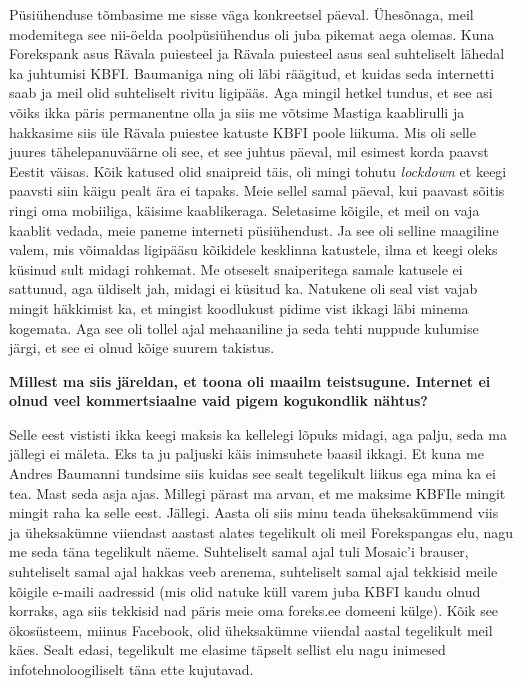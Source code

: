Püsiühenduse tõmbasime me sisse väga konkreetsel päeval. Ühesõnaga, meil modemitega see nii-öelda poolpüsiühendus oli juba pikemat aega olemas. Kuna Forekspank asus Rävala puiesteel ja Rävala puiesteel asus seal suhteliselt lähedal ka juhtumisi KBFI. Baumaniga ning oli läbi räägitud, et kuidas seda internetti saab ja meil olid  suhteliselt rivitu ligipääs. Aga mingil hetkel tundus, et see asi võiks ikka päris permanentne olla ja siis me võtsime Mastiga kaablirulli ja hakkasime siis üle Rävala puiestee katuste KBFI poole liikuma. Mis oli selle juures tähelepanuväärne oli see, et see juhtus päeval, mil esimest korda paavst Eestit väisas. Kõik katused olid snaipreid täis, oli mingi tohutu \emph{lockdown} et keegi paavsti siin käigu pealt ära ei tapaks. Meie sellel samal päeval, kui paavast sõitis ringi oma mobiiliga, käisime kaablikeraga. Seletasime kõigile, et meil on vaja kaablit vedada, meie paneme interneti püsiühendust. Ja see oli selline maagiline valem, mis  võimaldas ligipääsu kõikidele kesklinna katustele, ilma et keegi oleks küsinud sult midagi rohkemat. Me otseselt snaiperitega samale katusele ei sattunud, aga üldiselt jah, midagi ei küsitud ka. Natukene oli seal vist vajab mingit häkkimist ka, et mingist koodlukust pidime vist ikkagi läbi minema kogemata. Aga see oli tollel ajal mehaaniline ja seda tehti nuppude kulumise järgi, et see ei olnud kõige suurem takistus. 

\textbf{Millest ma siis järeldan, et toona oli maailm teistsugune. Internet ei olnud veel kommertsiaalne vaid pigem kogukondlik nähtus?}

Selle eest vististi ikka keegi maksis ka kellelegi lõpuks midagi, aga palju, seda ma jällegi ei mäleta. Eks ta ju paljuski käis inimsuhete baasil ikkagi. Et kuna me Andres Baumanni tundsime siis kuidas see sealt tegelikult  liikus ega mina ka ei tea. Mast seda asja ajas. Millegi pärast ma arvan, et  me maksime KBFIle mingit mingit raha ka selle eest. Jällegi. Aasta oli siis minu teada üheksakümmend viis ja üheksakümne viiendast aastast alates tegelikult oli meil Forekspangas elu, nagu me seda täna tegelikult näeme. Suhteliselt samal ajal tuli Mosaic'i brauser, suhteliselt samal ajal hakkas veeb arenema, suhteliselt samal ajal tekkisid meile kõigile e-maili aadressid (mis olid natuke küll varem juba KBFI kaudu olnud korraks, aga siis tekkisid nad päris meie oma foreks.ee domeeni külge). Kõik see ökosüsteem, miinus Facebook, olid üheksakümne viiendal aastal tegelikult meil käes. Sealt edasi,  tegelikult me elasime täpselt sellist elu nagu inimesed infotehnoloogiliselt täna ette kujutavad. 

